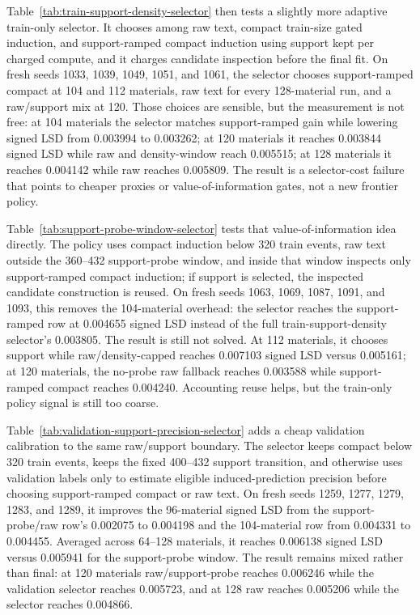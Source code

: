 \documentclass[11pt]{article}
\begin{document}
Table~\ref{tab:train-support-density-selector} then tests a slightly more
adaptive train-only selector. It chooses among raw text, compact train-size
gated induction, and support-ramped compact induction using support kept per
charged compute, and it charges candidate inspection before the final fit. On
fresh seeds 1033, 1039, 1049, 1051, and 1061, the selector chooses
support-ramped compact at 104 and 112 materials, raw text for every
128-material run, and a raw/support mix at 120. Those choices are sensible, but
the measurement is not free: at 104 materials the selector matches
support-ramped gain while lowering signed LSD from 0.003994 to 0.003262; at 120
materials it reaches 0.003844 signed LSD while raw and density-window reach
0.005515; at 128 materials it reaches 0.004142 while raw reaches 0.005809. The
result is a selector-cost failure that points to cheaper proxies or
value-of-information gates, not a new frontier policy.

Table~\ref{tab:support-probe-window-selector} tests that value-of-information
idea directly. The policy uses compact induction below 320 train events, raw
text outside the 360--432 support-probe window, and inside that window inspects
only support-ramped compact induction; if support is selected, the inspected
candidate construction is reused. On fresh seeds 1063, 1069, 1087, 1091, and
1093, this removes the 104-material overhead: the selector reaches the
support-ramped row at 0.004655 signed LSD instead of the full
train-support-density selector's 0.003805. The result is still not solved. At
112 materials, it chooses support while raw/density-capped reaches 0.007103
signed LSD versus 0.005161; at 120 materials, the no-probe raw fallback reaches
0.003588 while support-ramped compact reaches 0.004240. Accounting reuse helps,
but the train-only policy signal is still too coarse.

Table~\ref{tab:validation-support-precision-selector} adds a cheap validation
calibration to the same raw/support boundary. The selector keeps compact below
320 train events, keeps the fixed 400--432 support transition, and otherwise
uses validation labels only to estimate eligible induced-prediction precision
before choosing support-ramped compact or raw text. On fresh seeds 1259, 1277,
1279, 1283, and 1289, it improves the 96-material signed LSD from the
support-probe/raw row's 0.002075 to 0.004198 and the 104-material row from
0.004331 to 0.004455. Averaged across 64--128 materials, it reaches 0.006138
signed LSD versus 0.005941 for the support-probe window. The result remains
mixed rather than final: at 120 materials raw/support-probe reaches 0.006246
while the validation selector reaches 0.005723, and at 128 raw reaches 0.005206
while the selector reaches 0.004866.
\end{document}

